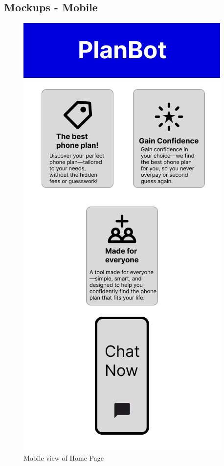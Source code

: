 \documentclass[conference]{IEEEtran}
\begin{document}
\subsection{Mockups - Mobile}
\begin{figure}[H]
    \centering
    \includegraphics[width=1\linewidth]{Mobile/Group 13MOBILE.png}
    \caption{Mobile view of Home Page}
    \label{fig:user flow}
\end{figure}
\end{document}
